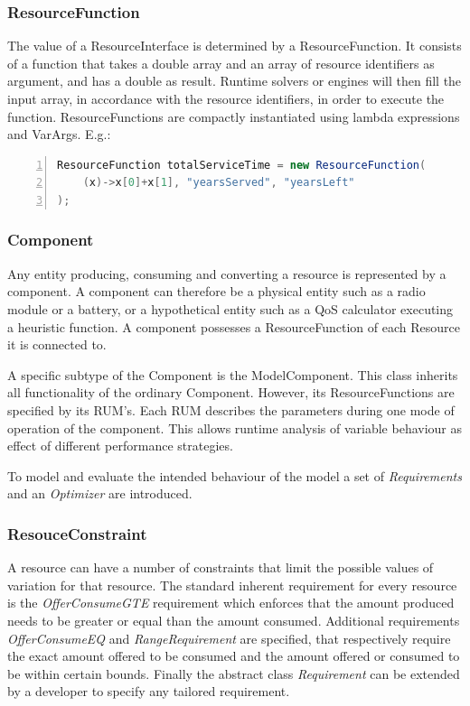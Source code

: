 \subsubsection{ResourceFunction}
The value of a ResourceInterface is determined by a ResourceFunction. It consists of a function that takes a double array and an array of resource identifiers as argument, and has a double as result. Runtime solvers or engines will then fill the input array, in accordance with the resource identifiers, in order to execute the function. ResourceFunctions are compactly instantiated using lambda expressions and VarArgs. E.g.:
\begin{lstlisting}[language=java, frame=single, numbers=left, tabsize=4, basicstyle=\small]
ResourceFunction totalServiceTime = new ResourceFunction(
	(x)->x[0]+x[1], "yearsServed", "yearsLeft"
);
\end{lstlisting}

\subsubsection{Component}
Any entity producing, consuming and converting a resource is represented by a component. A component can therefore be a physical entity such as a radio module or a battery, or a hypothetical entity such as a QoS calculator executing a heuristic function. A component possesses a ResourceFunction of each Resource it is connected to.

A specific subtype of the Component is the ModelComponent. This class inherits all functionality of the ordinary Component. However, its ResourceFunctions are specified by its RUM's. Each RUM describes the parameters during one mode of operation of the component. This allows runtime analysis of variable behaviour as effect of different performance strategies.

To model and evaluate the intended behaviour of the model a set of \emph{Requirements} and an \emph{Optimizer} are introduced.
\subsubsection{ResouceConstraint}
A resource can have a number of constraints that limit the possible values of variation for that resource. The standard inherent requirement for every resource is the \emph{OfferConsumeGTE} requirement which enforces that the amount produced needs to be greater or equal than the amount consumed. Additional requirements \emph{OfferConsumeEQ} and \emph{RangeRequirement} are specified, that respectively require the exact amount offered to be consumed and the amount offered or consumed to be within certain bounds. Finally the abstract class \emph{Requirement} can be extended by a developer to specify any tailored requirement.

